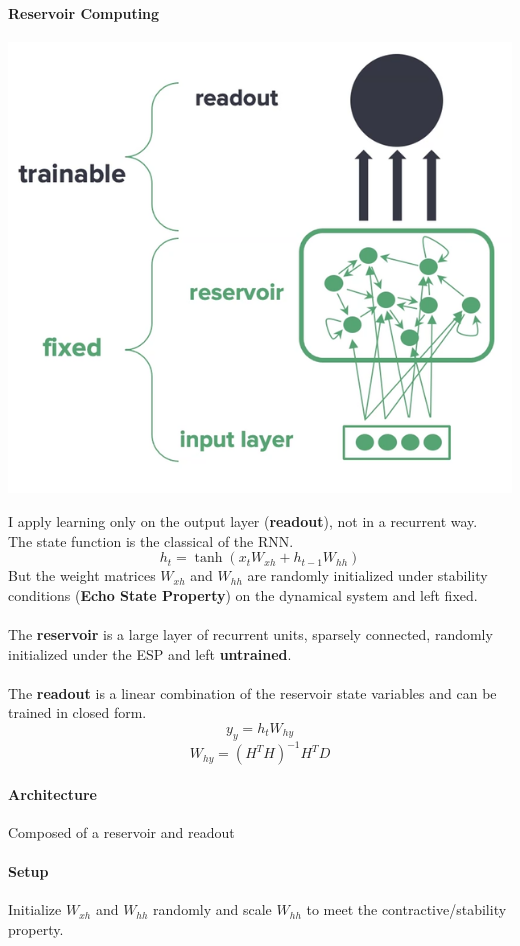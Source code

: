 \documentclass[10pt]{report}
\begin{document}
\paragraph{Reservoir Computing}
\begin{center}
	\includegraphics[scale=0.5]{103.png}
\end{center}
I apply learning only on the output layer (\textbf{readout}), not in a recurrent way.\\
The state function is the classical of the RNN.
$$h_t = \tanh(x_tW_{xh}+h_{t-1}W_{hh})$$
But the weight matrices $W_{xh}$ and $W_{hh}$ are randomly initialized under stability conditions (\textbf{Echo State Property}) on the dynamical system and left fixed.\\\\
The \textbf{reservoir} is a large layer of recurrent units, sparsely connected, randomly initialized under the ESP and left \textbf{untrained}.\\\\
The \textbf{readout} is a linear combination of the reservoir state variables and can be trained in closed form.
$$y_y = h_tW_{hy}$$
$$W_{hy} = (H^TH)^{-1}H^TD$$
\paragraph{Architecture} Composed of a reservoir and readout
\paragraph{Setup} Initialize $W_{xh}$ and $W_{hh}$ randomly and scale $W_{hh}$ to meet the contractive/stability property.
\end{document}
